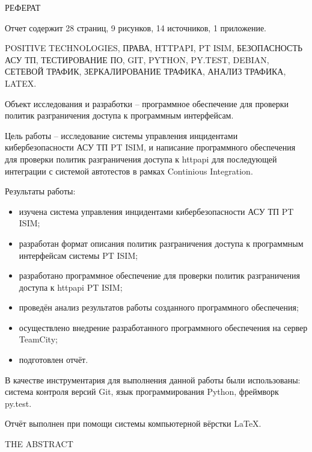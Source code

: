 \begin{center}
РЕФЕРАТ
\end{center}

Отчет содержит 28 страниц, 9 рисунков, 14 источников, 1 приложение.\par 

POSITIVE TECHNOLOGIES, ПРАВА, HTTPAPI, PT ISIM, БЕЗОПАСНОСТЬ АСУ ТП, ТЕСТИРОВАНИЕ ПО, GIT, PYTHON, PY.TEST, DEBIAN, СЕТЕВОЙ ТРАФИК, ЗЕРКАЛИРОВАНИЕ ТРАФИКА, АНАЛИЗ ТРАФИКА, LATEX.\par 

Объект исследования и разработки -- программное обеспечение для проверки политик разграничения доступа к программным интерфейсам.\par 

Цель работы -- исследование системы управления инцидентами кибербезопасности АСУ ТП PT ISIM, и написание программного обеспечения для проверки политик разграничения доступа к httpapi для последующей интеграции с системой автотестов в рамках Continious Integration.\par

Результаты работы:
\begin{itemize}
    \item изучена система управления инцидентами кибербезопасности АСУ ТП PT ISIM;
    \item разработан формат описания политик разграничения доступа к программным интерфейсам системы PT ISIM;
    \item разработано программное обеспечение для проверки политик разграничения доступа к httpapi PT ISIM;
    \item проведён анализ результатов работы созданного программного обеспечения;
    \item осуществлено внедрение разработанного программного обеспечения на сервер\\TeamCity;
    \item подготовлен отчёт.
\end{itemize} 

В качестве инструментария для выполнения данной работы были использованы: система контроля версий Git, язык программирования Python, фреймворк py.test.\par

Отчёт выполнен при помощи системы компьютерной вёрстки \LaTeX.

\clearpage

\begin{center}
THE ABSTRACT
\end{center}

